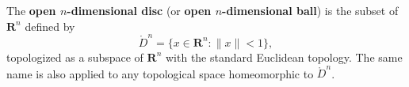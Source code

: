The \textbf{open $n$-dimensional disc} (or \textbf{open $n$-dimensional ball}) is the subset of $\mathbf{R}^n$ defined by
\[
\mathring{D}^n = \{x \in \mathbf{R}^n : \|x\| < 1\},
\]
topologized as a subspace of $\mathbf{R}^n$ with the standard Euclidean topology. The same name is also applied to any topological space homeomorphic to $\mathring{D}^n$.
